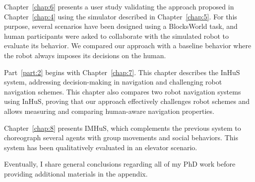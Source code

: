 Chapter~\ref{chap:6} presents a user study validating the approach proposed in Chapter~\ref{chap:4} using the simulator described in Chapter~\ref{chap:5}. For this purpose, several scenarios have been designed using a BlocksWorld task, and human participants were asked to collaborate with the simulated robot to evaluate its behavior. We compared our approach with a baseline behavior where the robot always imposes its decisions on the human. 

Part~\ref{part:2} begins with Chapter~\ref{chap:7}.
This chapter describes the InHuS system, addressing decision-making in navigation and challenging robot navigation schemes. This chapter also compares two robot navigation systems using InHuS, proving that our approach effectively challenges robot schemes and allows measuring and comparing human-aware navigation properties.


Chapter~\ref{chap:8} presents IMHuS, which complements the previous system to choreograph several agents with group movements and social behaviors. This system has been qualitatively evaluated in an elevator scenario.


Eventually, I share general conclusions regarding all of my PhD work before providing additional materials in the appendix.  


